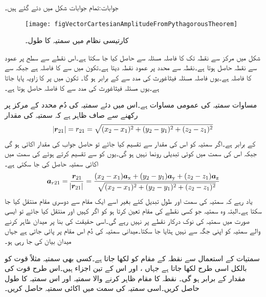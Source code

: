 جوابات:تمام جوابات شکل میں دئے گئے ہیں۔
\begin{figure}
\centering
\texttt{[image: figVectorCartesianAmplitudeFromPythagorousTheorem]}
\caption{کارتیسی نظام میں سمتیہ کا طول۔}
\label{شکل_سمتیہ_کارتیسی_سمتیہ_طول}
\end{figure}

شکل  میں مرکز سے نقطہ  تک کا فاصلہ  مسئلہ  سے حاصل کیا جا سکتا ہے۔اس نقطے سے  سطح پر عمود سے نقطہ  حاصل ہوتا ہے۔نقطہ  سے  محدد پر عمود نقطہ  دیتا ہے۔تکون  میں  سے  کا فاصلہ  ہے جبکہ  سے  کا فاصلہ  ہے۔یوں فاصلہ  مسئلہ فیثاغورث کی مدد سے   کے برابر ہو گا۔ تکون  میں  پر  کا زاویہ پایا جاتا ہے۔یوں مسئلہ فیثاغورث کی مدد سے  کا فاصلہ  حاصل ہوتا ہے۔

مساوات  سمتیہ کی عمومی مساوات ہے۔اس میں دئے سمتیہ  کی دُم محدد کے مرکز پر رکھنے سے صاف ظاہر ہے کہ سمتیہ کی مقدار
\begin{align}
\abs{{{\boldsymbol{r}}}_{21}}=r_{21}=\sqrt{(x_2-x_1)^2+(y_2-y_1)^2+(z_2-z_1)^2}
\end{align}
کے برابر ہے۔اگر سمتیہ کو اس کی مقدار سے تقسیم کیا جائے تو حاصل جواب کی مقدار اکائی ہو گی جبکہ اس کی سمت میں کوئی تبدیلی رونما نہیں ہو گی۔یوں   کو  سے تقسیم کرتے ہوئے  کی سمت میں اکائی سمتیہ  حاصل کی جا سکتی ہے۔
\begin{align}
{\ensuremath{{\boldsymbol{a}}}}_{r21}=\frac{{{\boldsymbol{r}}}_{21}}{\abs{{{\boldsymbol{r}}}_{21}}}=\frac{(x_2-x_1) {\boldsymbol{a}}_{\textup{x}}+(y_2-y_1){\boldsymbol{a}}_{\textup{y}}+(z_2-z_1){\boldsymbol{a}}_{\textup{z}}}{\sqrt{(x_2-x_1)^2+(y_2-y_1)^2+(z_2-z_1)^2}}
\end{align}
یاد رہے کہ سمتیہ کی سمت اور طول تبدیل کئے بغیر اسے ایک مقام سے دوسری مقام منتقل کیا جا سکتا ہے۔البتہ وہ سمتیہ جو کسی نقطے کی مقام تعین کرتا ہو کو اگر کہیں اور منتقل کیا جائے تو ایسی صورت میں  سمتیہ کی نوک درکار نقطے پر نہیں رہے گی۔اسی حقیقت کی بنا پر میدان ظاہر کرنے والے سمتیہ کو اپنی جگہ سے نہیں ہٹایا جا سکتا۔میدانی سمتیہ کی دُم اس مقام پر پائی جاتی ہے جہاں میدان بیان کی جا رہی ہو۔  

سمتیات کے استعمال سے نقطہ  کے مقام کو  لکھا جاتا ہے۔کسی بھی سمتیہ مثلاً قوت  کو بالکل اسی طرح   لکھا جاتا ہے جہاں ،  اور  اس کے تین اجزاء ہیں۔اس طرح قوت کی مقدار   کے برابر ہو گی۔
نقطہ   کا مقام ظاہر کرنے والا سمتیہ اور اس سمتیہ کا طول حاصل کریں۔اسی سمتیہ کی سمت میں اکائی سمتیہ حاصل کریں۔

